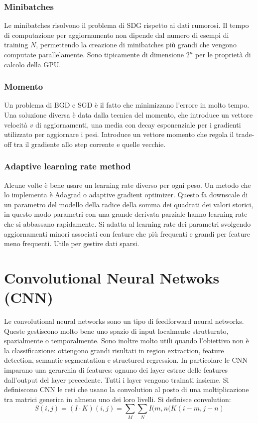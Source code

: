 		\subsubsection{Minibatches}
		Le minibatches risolvono il problema di SDG rispetto ai dati rumorosi.
		Il tempo di computazione per aggiornamento non dipende dal numero di esempi di training $N$, permettendo la creazione di minibatches pi\`u grandi che vengono computate parallelamente.
		Sono tipicamente di dimensione $2^n$ per le propriet\`a di calcolo della GPU.

		\subsubsection{Momento}
		Un problema di BGD e SGD \`e il fatto che minimizzano l'errore in molto tempo.
		Una soluzione diversa \`e data dalla tecnica del momento, che introduce un vettore velocit\`a $v$ di aggiornamenti, una media con decay esponenziale per i gradienti utilizzato per aggiornare i pesi.
		Introduce un vettore momento che regola il trade-off tra il gradiente allo step corrente e quelle vecchie.\\
		

		\subsubsection{Adaptive learning rate method}
		Alcune volte \`e bene usare un learning rate diverso per ogni peso.
		Un metodo che lo implementa \`e Adagrad o adaptive gradient optimizer.
		Questo fa downscale di un parametro del modello della radice della somma dei quadrati dei valori storici, in questo modo parametri con una grande derivata parziale hanno learning rate che si abbassano rapidamente.
		Si adatta al learning rate dei parametri svolgendo aggiornamenti minori associati con feature che pi\`u frequenti e grandi per feature meno frequenti.
		Utile per gestire dati sparsi.\\
		

\section{Convolutional Neural Netwoks (CNN)}
Le convolutional neural networks sono un tipo di feedforward neural networks.
Queste gestiscono molto bene uno spazio di input localmente strutturato, spazialmente o temporalmente.
Sono inoltre molto utili quando l'obiettivo non \`e la classificazione: ottengono grandi risultati in region extraction, feature detection, semantic segmentation e structured regression.
In particolare le CNN imparano una gerarchia di features: ognuno dei layer estrae delle features dall'output del layer precedente.
Tutti i layer vengono trainati insieme.
Si definiscono CNN le reti che usano la convolution al posto di una moltiplicazione tra matrici generica in almeno uno dei loro livelli.
Si definisce convolution:
$$S(i, j) = (I\cdot K)(i,j) = \sum\limits_M\sum\limits_NI(m,n(K(i-m,j-n)$$

